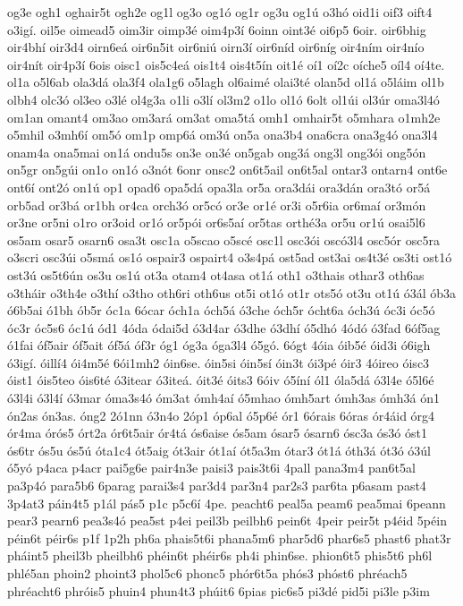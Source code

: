 {og3e
ogh1
oghair5t
ogh2e
og1l
og3o
og1ó
og1r
og3u
og1ú
o3hó
oid1i
oif3
oift4
o3igí.
oil5e
oimead5
oim3ir
oimp3é
oim4p3í
6oinn
oint3é
oi6p5
6oir.
oir6bhig
oir4bhí
oir3d4
oirn6eá
oir6n5it
oir6niú
oirn3í
oir6níd
oir6níg
oir4ním
oir4nío
oir4nít
oir4p3í
6ois
oisc1
ois5c4eá
ois1t4
ois4t5ín
oit1é
oí1
oí2c
oíche5
oíl4
oí4te.
ol1a
o5l6ab
ola3dá
ola3f4
ola1g6
o5lagh
ol6aimé
olai3té
olan5d
ol1á
o5láim
ol1b
olbh4
olc3ó
ol3eo
o3lé
ol4g3a
o1li
o3lí
ol3m2
o1lo
ol1ó
6olt
ol1úi
ol3úr
oma3l4ó
om1an
omant4
om3ao
om3ará
om3at
oma5tá
omh1
omhair5t
o5mhara
o1mh2e
o5mhil
o3mh6í
om5ó
om1p
omp6á
om3ú
on5a
ona3b4
ona6cra
ona3g4ó
ona3l4
onam4a
ona5mai
on1á
ondu5s
on3e
on3é
on5gab
ong3á
ong3l
ong3ói
ong5ón
on5gr
on5gúi
on1o
on1ó
o3nót
6onr
onsc2
on6t5ail
on6t5al
ontar3
ontarn4
ont6e
ont6í
ont2ó
on1ú
op1
opad6
opa5dá
opa3la
or5a
ora3dái
ora3dán
ora3tó
or5á
orb5ad
or3bá
or1bh
or4ca
orch3ó
or5có
or3e
or1é
or3i
o5r6ia
or6maí
or3món
or3ne
or5ni
o1ro
or3oid
or1ó
or5pói
or6s5aí
or5tas
orthé3a
or5u
or1ú
osai5l6
os5am
osar5
osarn6
osa3t
osc1a
o5scao
o5scé
osc1l
osc3ói
oscó3l4
osc5ór
osc5ra
o3scri
osc3úi
o5smá
os1ó
ospair3
ospairt4
o3s4pá
ost5ad
ost3ai
os4t3é
os3ti
ost1ó
ost3ú
os5t6ún
os3u
os1ú
ot3a
otam4
ot4asa
ot1á
oth1
o3thais
othar3
oth6as
o3tháir
o3th4e
o3thí
o3tho
oth6ri
oth6us
ot5i
ot1ó
ot1r
ots5ó
ot3u
ot1ú
ó3ál
ób3a
ó6b5ai
ó1bh
ób5r
óc1a
6ócar
óch1a
óch5á
ó3che
óch5r
ócht6a
óch3ú
óc3i
óc5ó
óc3r
óc5s6
óc1ú
ód1
4óda
ódai5d
ó3d4ar
ó3dhe
ó3dhí
ó5dhó
4ódó
ó3fad
6óf5ag
ó1fai
óf5air
óf5ait
óf5á
óf3r
óg1
óg3a
óga3l4
ó5gó.
6ógt
4óia
óib5é
óid3i
ó6igh
ó3igí.
óillí4
ói4m5é
6ói1mh2
óin6se.
óin5si
óin5sí
óin3t
ói3pé
óir3
4óireo
óisc3
óist1
óis5teo
óis6té
ó3itear
ó3iteá.
óit3é
óits3
6óiv
ó5íní
ól1
óla5dá
ó3l4e
ó5l6é
ó3l4i
ó3l4í
ó3mar
óma3s4ó
óm3at
ómh4aí
ó5mhao
ómh5art
ómh3as
ómh3á
ón1
ón2as
ón3as.
óng2
2ó1nn
ó3n4o
2óp1
óp6al
ó5p6é
ór1
6órais
6óras
ór4áid
órg4
ór4ma
órós5
órt2a
ór6t5air
ór4tá
ós6aise
ós5am
ósar5
ósarn6
ósc3a
ós3ó
óst1
ós6tr
ós5u
ós5ú
óta1c4
ót5aig
ót3air
ót1aí
ót5a3m
ótar3
ót1á
óth3á
ót3ó
ó3úl
ó5yó
p4aca
p4acr
pai5g6e
pair4n3e
paisi3
pais3t6i
4pall
pana3m4
pan6t5al
pa3p4ó
para5b6
6parag
parai3s4
par3d4
par3n4
par2s3
par6ta
p6asam
past4
3p4at3
páin4t5
p1ál
pás5
p1c
p5c6í
4pe.
peacht6
peal5a
peam6
pea5mai
6peann
pear3
pearn6
pea3s4ó
pea5st
p4ei
peil3b
peilbh6
pein6t
4peir
peir5t
p4éid
5péin
péin6t
péir6s
p1f
1p2h
ph6a
phais5t6i
phana5m6
phar5d6
phar6s5
phast6
phat3r
pháint5
pheil3b
pheilbh6
phéin6t
phéir6s
ph4i
phin6se.
phion6t5
phis5t6
ph6l
phlé5an
phoin2
phoint3
phol5c6
phonc5
phór6t5a
phós3
phóst6
phréach5
phréacht6
phróis5
phuin4
phun4t3
phúit6
6pias
pic6s5
pi3dé
pid5i
pi3le
p3im
}

